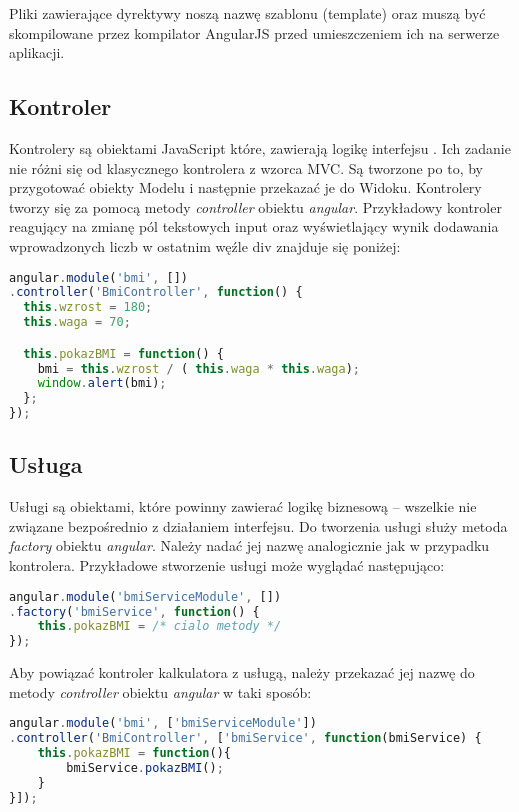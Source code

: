 Pliki zawierające dyrektywy noszą nazwę szablonu (template) oraz muszą być skompilowane przez kompilator AngularJS przed umieszczeniem ich na serwerze aplikacji.

\subsection{Kontroler}
Kontrolery są obiektami JavaScript które, zawierają logikę interfejsu \cite{angular-book}. Ich zadanie nie różni się od klasycznego kontrolera z wzorca MVC. Są tworzone po to, by przygotować obiekty Modelu i następnie przekazać je do Widoku. Kontrolery tworzy się za pomocą metody \textit{controller} obiektu \textit{angular}. Przykładowy kontroler reagujący na zmianę pól tekstowych input oraz wyświetlający wynik dodawania wprowadzonych liczb w ostatnim węźle div znajduje się poniżej:

\begin{lstlisting}[language=JavaScript]
angular.module('bmi', [])
.controller('BmiController', function() {
  this.wzrost = 180;
  this.waga = 70;

  this.pokazBMI = function() {
  	bmi = this.wzrost / ( this.waga * this.waga);
    window.alert(bmi);
  };
});
\end{lstlisting}


\subsection{Usługa}
Usługi są obiektami, które powinny zawierać logikę biznesową -- wszelkie nie związane bezpośrednio z działaniem interfejsu. Do tworzenia usługi służy metoda \textit{factory} obiektu \textit{angular}. Należy nadać jej nazwę analogicznie jak w przypadku kontrolera. Przykładowe stworzenie usługi może wyglądać następująco:
\begin{lstlisting}[language=JavaScript]
angular.module('bmiServiceModule', [])
.factory('bmiService', function() {
	this.pokazBMI = /* cialo metody */
});
\end{lstlisting}

Aby powiązać kontroler kalkulatora z usługą, należy przekazać jej nazwę do metody \textit{controller} obiektu \textit{angular} w taki sposób:
\begin{lstlisting}[language=JavaScript]
angular.module('bmi', ['bmiServiceModule'])
.controller('BmiController', ['bmiService', function(bmiService) {
	this.pokazBMI = function(){
		bmiService.pokazBMI();
	}
}]);
\end{lstlisting}

